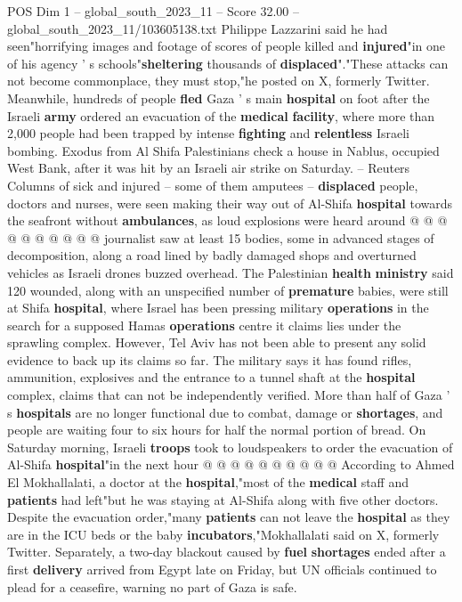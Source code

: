 \begin{textsample}{POS Dim 1 – global\_south\_2023\_11 – Score 32.00 – global\_south\_2023\_11/103605138.txt}
Philippe Lazzarini said he had seen"horrifying images and footage of scores of people killed and \textbf{injured}"in one of his agency ' s schools"\textbf{sheltering} thousands of \textbf{displaced}"."These attacks can not become commonplace, they must stop,"he posted on X, formerly Twitter.
Meanwhile, hundreds of people \textbf{fled} Gaza ' s main \textbf{hospital} on foot after the Israeli \textbf{army} ordered an evacuation of the \textbf{medical} \textbf{facility}, where more than 2,000 people had been trapped by intense \textbf{fighting} and \textbf{relentless} Israeli bombing.
Exodus from Al Shifa Palestinians check a house in Nablus, occupied West Bank, after it was hit by an Israeli air strike on Saturday. -- Reuters Columns of sick and injured -- some of them amputees -- \textbf{displaced} people, doctors and nurses, were seen making their way out of Al-Shifa \textbf{hospital} towards the seafront without \textbf{ambulances}, as loud explosions were heard around @ @ @ @ @ @ @ @ @ @ journalist saw at least 15 bodies, some in advanced stages of decomposition, along a road lined by badly damaged shops and overturned vehicles as Israeli drones buzzed overhead.
The Palestinian \textbf{health} \textbf{ministry} said 120 wounded, along with an unspecified number of \textbf{premature} babies, were still at Shifa \textbf{hospital}, where Israel has been pressing military \textbf{operations} in the search for a supposed Hamas \textbf{operations} centre it claims lies under the sprawling complex.
However, Tel Aviv has not been able to present any solid evidence to back up its claims so far.
The military says it has found rifles, ammunition, explosives and the entrance to a tunnel shaft at the \textbf{hospital} complex, claims that can not be independently verified.
More than half of Gaza ' s \textbf{hospitals} are no longer functional due to combat, damage or \textbf{shortages}, and people are waiting four to six hours for half the normal portion of bread.
On Saturday morning, Israeli \textbf{troops} took to loudspeakers to order the evacuation of Al-Shifa \textbf{hospital}"in the next hour @ @ @ @ @ @ @ @ @ @ According to Ahmed El Mokhallalati, a doctor at the \textbf{hospital},"most of the \textbf{medical} staff and \textbf{patients} had left"but he was staying at Al-Shifa along with five other doctors.
Despite the evacuation order,"many \textbf{patients} can not leave the \textbf{hospital} as they are in the ICU beds or the baby \textbf{incubators},"Mokhallalati said on X, formerly Twitter.
Separately, a two-day blackout caused by \textbf{fuel} \textbf{shortages} ended after a first \textbf{delivery} arrived from Egypt late on Friday, but UN officials continued to plead for a ceasefire, warning no part of Gaza is safe.

\end{textsample}
